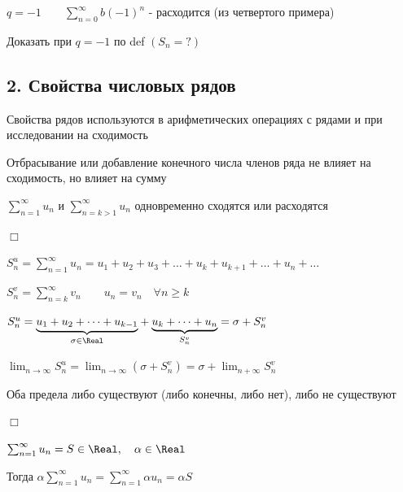\documentclass[12pt]{article}
\begin{document}
    $q = -1 \quad\quad \sum_{n = 0}^\infty b (-1)^n$ - расходится (из четвертого примера)

    \Lab Доказать при $q = -1$ по def $(S_n = ?)$\

    \hypertarget{seriesproperties}{}

    \subsection{2. Свойства числовых рядов}

    \Notas Свойства рядов используются в арифметических операциях с рядами и при исследовании на сходимость

    \begin{MyTheorem}
         Отбрасывание или добавление конечного числа членов ряда не влияет на сходимость, но влияет на сумму

        $\sum_{n = 1}^\infty u_n$ и $\sum_{n = k > 1}^\infty u_n$ одновременно сходятся или расходятся
    \end{MyTheorem}

    \begin{tcolorbox}
        $\Box$

        $S^u_n = \sum_{n = 1}^{\infty} u_n = u_1 + u_2 + u_3 + \dots + u_k + u_{k + 1} + \dots + u_n + \dots$

        $S^v_n = \sum_{n = k}^\infty v_n \quad\quad u_n = v_n \quad \forall n \geq k$

        $S_n^u = \underset{\sigma \in \Real}{\underbrace{u_1 + u_2 + \dots + u_{k - 1}}} + \underset{S^v_n}{\underbrace{u_{k} + \dots + u_n}} = \sigma + S^v_n$

        $\lim_{n \to \infty} S_n^u = \lim_{n \to \infty} (\sigma + S^v_n) = \sigma + \lim_{n + \infty} S_n^v$

        \smallvspace

        Оба предела либо существуют (либо конечны, либо нет), либо не существуют



        $\Box$
    \end{tcolorbox}

    \begin{MyTheorem}
         $\sum_{n = 1}^\infty u_n = S \in \Real, \quad \alpha \in \Real$

        Тогда $\alpha \sum_{n = 1}^\infty u_n = \sum_{n = 1}^\infty \alpha u_n = \alpha S$
    \end{MyTheorem}
\end{document}
